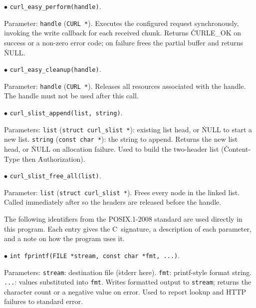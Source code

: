 \item{$\bullet$} {\tt curl\_easy\_perform(handle)}.
\par\noindent Parameter: {\tt handle} ({\tt CURL *}).
Executes the configured request synchronously, invoking the write
callback for each received chunk.
Returns \.{CURLE\_OK} on success or a non-zero error code; on failure
 frees the partial buffer and returns \.{NULL}.

\item{$\bullet$} {\tt curl\_easy\_cleanup(handle)}.
\par\noindent Parameter: {\tt handle} ({\tt CURL *}).
Releases all resources associated with the handle.
The handle must not be used after this call.

\item{$\bullet$} {\tt curl\_slist\_append(list, string)}.
\par\noindent Parameters:
\itemitem{--} {\tt list} ({\tt struct curl\_slist *}):
existing list head, or \.{NULL} to start a new list.
\itemitem{--} {\tt string} ({\tt const char *}): the string to append.
Returns the new list head, or \.{NULL} on allocation failure.
Used to build the two-header list
(\.{Content-Type} then \.{Authorization}).

\item{$\bullet$} {\tt curl\_slist\_free\_all(list)}.
\par\noindent Parameter: {\tt list} ({\tt struct curl\_slist *}).
Frees every node in the linked list.
Called immediately after  so the headers are
released before the handle.

\fi

The following identifiers from the POSIX.1-2008 standard are used
directly in this program.  Each entry gives the C~signature, a
description of each parameter, and a note on how the program uses it.

\medskip
\item{$\bullet$} {\tt int fprintf(FILE *stream, const char *fmt, ...)}.
\par\noindent Parameters:
\itemitem{--} {\tt stream}: destination file (\.{stderr} here).
\itemitem{--} {\tt fmt}: printf-style format string.
\itemitem{--} {\tt ...}: values substituted into {\tt fmt}.
Writes formatted output to {\tt stream}; returns the character count
or a negative value on error.
Used to report lookup and HTTP failures to standard error.

